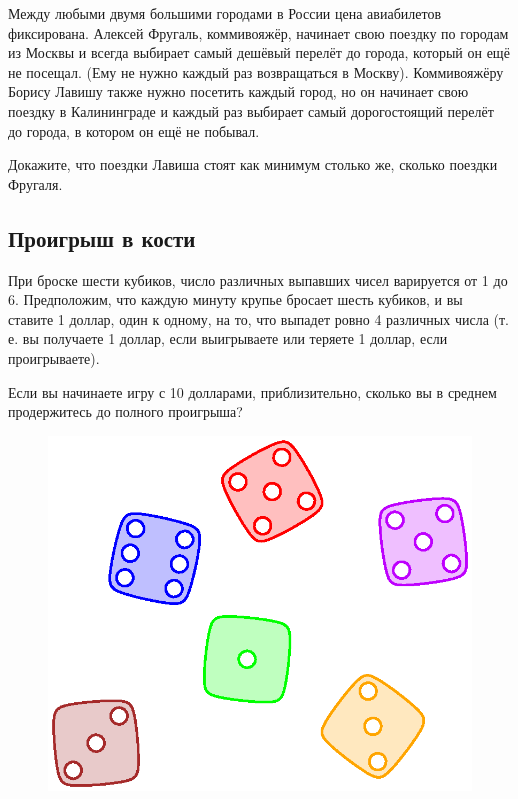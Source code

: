 Между любыми двумя большими городами в России цена авиабилетов фиксирована.
Алексей Фругаль, коммивояжёр, начинает свою поездку по городам из Москвы и всегда выбирает самый дешёвый перелёт до города, который он ещё не посещал.
(Ему не нужно каждый раз возвращаться в Москву).
Коммивояжёру Борису Лавишу также нужно посетить каждый город, но он начинает свою поездку в Калининграде и каждый раз выбирает самый дорогостоящий перелёт до города, в котором он ещё не побывал.

Докажите, что поездки Лавиша стоят как минимум столько же, сколько поездки Фругаля. %

\subsection*{Проигрыш в кости}%

При броске шести кубиков, число различных выпавших чисел варируется от 1 до 6.
Предположим, что каждую минуту крупье бросает шесть кубиков,
и вы ставите 1 доллар, один к одному, на то, что выпадет ровно 4 различных числа
(т. е. вы получаете 1 доллар, если выигрываете или теряете 1 доллар, если проигрываете).

Если вы начинаете игру с 10 долларами, приблизительно, сколько вы в среднем продержитесь до полного проигрыша?

\begin{figure}[h!]
\centering
\includegraphics[scale=0.5]{Figs/Combinatorics/throw}
\end{figure}
